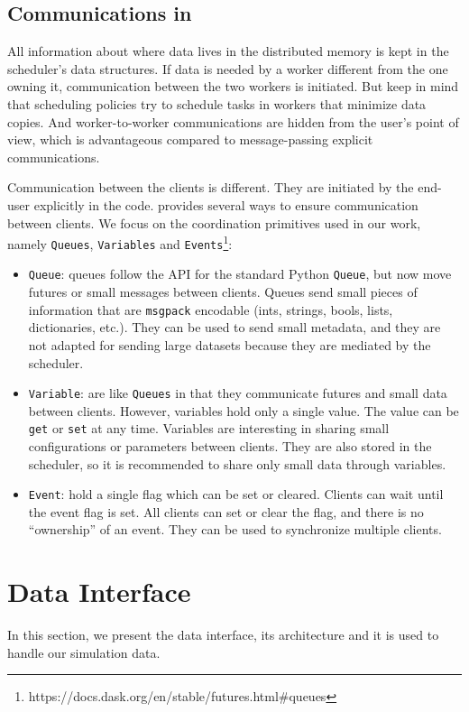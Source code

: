 \subsection{Communications in \dask}
All information about where data lives in the distributed memory is kept in the scheduler's data structures. If data is needed by a worker different from the one owning it, communication between the two workers is initiated. But keep in mind that \dask scheduling policies try to schedule tasks in workers that minimize data copies. 
And worker-to-worker communications are hidden from the user's point of view, which is advantageous compared to message-passing explicit communications.

Communication between the clients is different. They are initiated by the end-user explicitly in the code. \dask provides several ways to ensure communication between clients. We focus on the coordination primitives used in our work, namely \texttt{Queues}, \texttt{Variables} and \texttt{Events}\footnote{https://docs.dask.org/en/stable/futures.html\#queues}: 

\begin{itemize}
    \item \texttt{Queue}: \dask queues follow the API for the standard Python \texttt{Queue}, but now move futures or small messages between clients. Queues send small pieces of information that are \texttt{msgpack} encodable (ints, strings, bools, lists, dictionaries, etc.). They can be used to send small metadata, and they are not adapted for sending large datasets because they are mediated by the scheduler.
    
    \item \texttt{Variable}: are like \texttt{Queues} in that they communicate futures and small data between clients. However, variables hold only a single value. The value can be \texttt{get} or \texttt{set} at any time. Variables are interesting in sharing small configurations or parameters between clients. They are also stored in the scheduler, so it is recommended to share only small data through variables.
    
    \item \texttt{Event}: hold a single flag which can be set or cleared. Clients can wait until the event flag is set. All clients can set or clear the flag, and there is no “ownership” of an event. They can be used to synchronize multiple clients.
\end{itemize}


\newpage
\section{\pdi Data Interface}\label{sec:pdi}
In this section, we present the \pdi data interface, its architecture and it is used to handle our simulation data.


